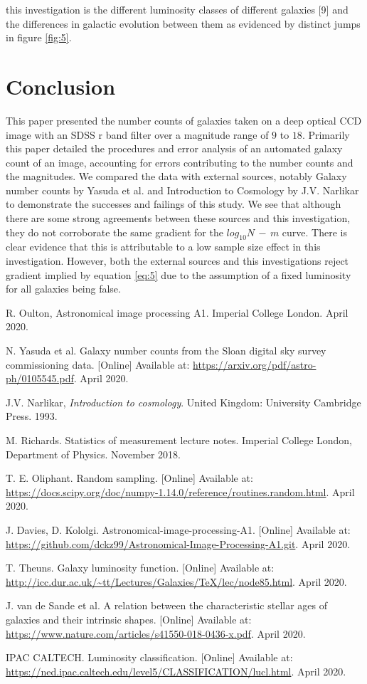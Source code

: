 \documentclass[journal]{IEEEtran}
\begin{document}
this investigation is the different luminosity classes of different galaxies [9] and the differences in galactic evolution between them as evidenced by distinct jumps in figure \ref{fig:5}.

\section{Conclusion}
This paper presented the number counts of galaxies taken on a deep optical CCD image with an SDSS r band filter over a magnitude range of $9$ to $18$. Primarily this paper detailed the procedures and error analysis of an automated galaxy count of an image, accounting for errors contributing to the number counts and the magnitudes. We compared the data with external sources, notably Galaxy number counts by Yasuda et al. and Introduction to Cosmology by J.V. Narlikar to demonstrate the successes and failings of this study. We see that although there are some strong agreements between these sources and this investigation, they do not corroborate the same gradient for the $log_{10}N\,-\,m$ curve. There is clear evidence that this is attributable to a low sample size effect in this investigation. However, both the external sources and this investigations reject gradient implied by equation \ref{eq:5} due to the assumption of a fixed luminosity for all galaxies being false.
\begin{thebibliography}{1}

 R. Oulton, Astronomical image processing A1. Imperial College London. April 2020.

 N. Yasuda et al. Galaxy number counts from the Sloan digital sky survey commissioning data. [Online] Available at: \url{https://arxiv.org/pdf/astro-ph/0105545.pdf}. April 2020.

  J.V. Narlikar, \textit{Introduction to cosmology}. United Kingdom: University Cambridge Press. 1993.

 M. Richards. Statistics of measurement lecture notes. Imperial College London, Department of Physics. November 2018.

 T. E. Oliphant. Random sampling. [Online] Available at: \url{https://docs.scipy.org/doc/numpy-1.14.0/reference/routines.random.html}. April 2020.

 J. Davies, D. Kololgi. Astronomical-image-processing-A1. [Online] Available at: \url{https://github.com/dckz99/Astronomical-Image-Processing-A1.git}. April 2020.

 T. Theuns. Galaxy luminosity function. [Online] Available at: \url{http://icc.dur.ac.uk/~tt/Lectures/Galaxies/TeX/lec/node85.html}. April 2020.

 J. van de Sande et al. A relation between the characteristic stellar ages
of galaxies and their intrinsic shapes. [Online] Available at: \url{https://www.nature.com/articles/s41550-018-0436-x.pdf}. April 2020.

 IPAC CALTECH. Luminosity classification. [Online] Available at: \url{https://ned.ipac.caltech.edu/level5/CLASSIFICATION/lucl.html}. April 2020.

\end{thebibliography}
\end{document}
